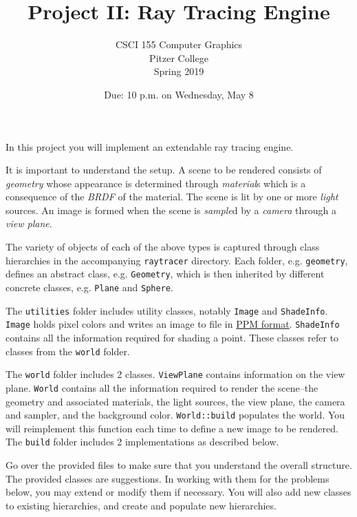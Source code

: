 \documentclass[addpoints]{exam}
\title{Project II: Ray Tracing Engine}
\author{CSCI 155 Computer Graphics\\Pitzer College\\Spring 2019}
\date{Due: 10 p.m. on Wednesday, May 8}
\begin{document}
\maketitle
\thispagestyle{empty}

In this project you will implement an extendable ray tracing engine.

It is important to understand the setup. A scene to be rendered consists of \emph{geometry} whose appearance is determined through \emph{material}s which is a consequence of the \emph{BRDF} of the material. The scene is lit by one or more \emph{light} sources. An image is formed when the scene is \emph{sample}d by a \emph{camera} through a \emph{view plane}.

The variety of objects of each of the above types is captured through class hierarchies in the accompanying \texttt{raytracer} directory. Each folder, e.g. \texttt{geometry}, defines an abstract class, e.g. \texttt{Geometry}, which is then inherited by different concrete classes, e.g. \texttt{Plane} and \texttt{Sphere}.

The \texttt{utilities} folder includes utility classes, notably \texttt{Image} and \texttt{ShadeInfo}. \texttt{Image} holds pixel colors and writes an image to file in \href{https://en.wikipedia.org/wiki/Netpbm_format#PBM_example}{PPM format}. \texttt{ShadeInfo} contains all the information required for shading a point. These classes refer to classes from the \texttt{world} folder.

The \texttt{world} folder includes 2 classes. \texttt{ViewPlane} contains information on the view plane. \texttt{World} contains all the information required to render the scene--the geometry and associated materials, the light sources, the view plane, the camera and sampler, and the background color. \texttt{World::build} populates the world. You will reimplement this function each time to define a new image to be rendered. The \texttt{build} folder includes 2 implementations as described below.

Go over the provided files to make sure that you understand the overall structure. The provided classes are suggestions. In working with them for the problems below, you may extend or modify them if necessary. You will also add new classes to existing hierarchies, and create and populate new hierarchies.
\end{document}
